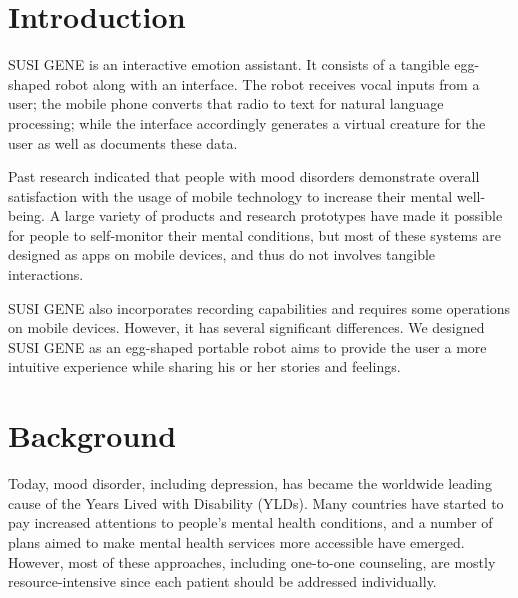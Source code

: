 \documentclass[manuscript,screen]{acmart}
\begin{document}
\maketitle

\section{Introduction}

SUSI GENE is an interactive emotion assistant.  It consists of a tangible egg-shaped robot along with an interface. The robot receives vocal inputs from a user; the mobile phone converts that radio to text for natural language processing; while the interface accordingly generates a virtual creature for the user as well as documents these data.

Past research indicated that people with mood disorders demonstrate overall satisfaction with the usage of mobile technology to increase their mental well-being.\cite{proudfoot2010community}
A large variety of products and research prototypes have made it possible for people to self-monitor their mental conditions, but most of these systems are designed as apps on mobile devices, and thus do not involves tangible interactions.

SUSI GENE also incorporates recording capabilities and requires some operations on mobile devices. However, it has several significant differences. We designed SUSI GENE as an egg-shaped portable robot aims to provide the user a more intuitive experience while sharing his or her stories and feelings. 

\section{Background}

Today, mood disorder, including depression, has became the worldwide leading cause of the Years Lived with Disability (YLDs). Many countries have started to pay increased attentions to people’s mental health conditions, and a number of plans aimed to make mental health services more accessible have emerged. However, most of these approaches, including one-to-one counseling, are mostly resource-intensive since each patient should be addressed individually.\cite{world2019special}
\end{document}

